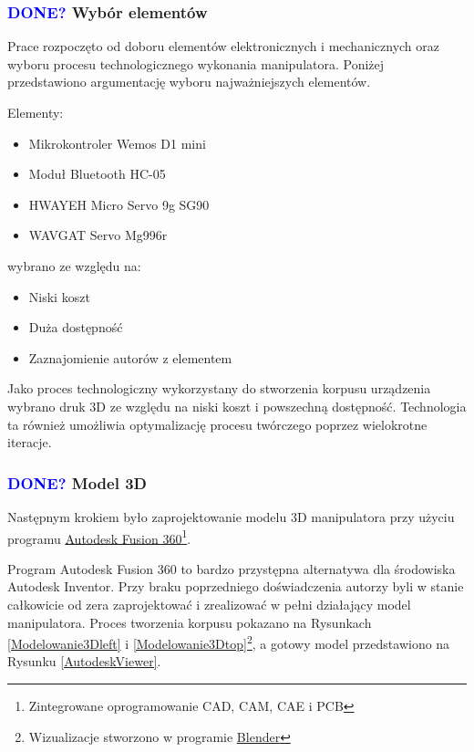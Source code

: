 \documentclass[11pt,titlepage,a4paper]{article}
\begin{document}
\subsubsection{\textcolor{blue}{DONE?} Wybór elementów}

Prace rozpoczęto od doboru elementów elektronicznych i mechanicznych oraz wyboru procesu technologicznego wykonania manipulatora. Poniżej przedstawiono argumentację wyboru najważniejszych elementów.

\medskip

Elementy:
\begin{itemize}
    \item Mikrokontroler Wemos D1 mini
    \item Moduł Bluetooth HC-05
    \item HWAYEH Micro Servo 9g SG90
    \item WAVGAT Servo Mg996r
\end{itemize}
wybrano ze względu na:
\begin{itemize}
    \item Niski koszt
    \item Duża dostępność
    \item Zaznajomienie autorów z elementem
\end{itemize}

\medskip

Jako proces technologiczny wykorzystany do stworzenia korpusu urządzenia wybrano druk 3D ze względu na niski koszt i powszechną dostępność. Technologia ta również umożliwia optymalizację procesu twórczego poprzez wielokrotne iteracje.

\newpage

\subsubsection{\textcolor{blue}{DONE?} Model 3D}

Następnym krokiem było zaprojektowanie modelu 3D manipulatora przy użyciu programu \href{https://www.autodesk.pl/products/fusion-360}{\underline{Autodesk Fusion 360}\footnote{Zintegrowane oprogramowanie CAD, CAM, CAE i PCB}}.

Program Autodesk Fusion 360 to bardzo przystępna alternatywa dla środowiska Autodesk Inventor. Przy braku poprzedniego doświadczenia autorzy byli w stanie całkowicie od zera zaprojektować i zrealizować w pełni działający model manipulatora. Proces tworzenia korpusu pokazano na Rysunkach \ref{Modelowanie3Dleft} i \ref{Modelowanie3Dtop}\footnote{Wizualizacje stworzono w programie \href{https://www.blender.org}{\underline{Blender}}}, a gotowy model przedstawiono na Rysunku \ref{AutodeskViewer}.
\end{document}

